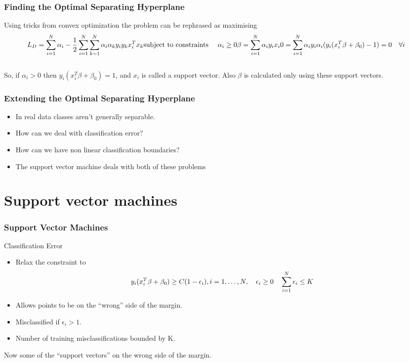 \documentclass{beamer}
\begin{document}
\begin{frame}
	\frametitle{Finding the Optimal Separating Hyperplane}
	Using tricks from convex optimization the problem can be rephrased as maximising
	\begin{equation*}
		L_D = \sum_{i=1}^N \alpha_i - \frac{1}{2}\sum_{i=1}^N\sum_{k=1}^N \alpha_i \alpha_k y_i y_k x_i^Tx_k \\
		\text{subject to constraints \quad}
		\alpha_i \ge 0\\
		\beta = \sum_{i=1}^N \alpha_i y_i x_i\\
		0 = \sum_{i=1}^N \alpha_i y_i \\
		\alpha_i(y_i(x_i^T\beta + \beta_0) -1) = 0 \quad \forall i
	\end{equation*}
	\\[14pt]
	So, if $\alpha_i>0$ then $y_i(x_i^T\beta + \beta_0) = 1$, and $x_i$ is called a support vector.
	Also $\beta$ is calculated only using these support vectors.
\end{frame}

\begin{frame}
	\frametitle{Extending the Optimal Separating Hyperplane}
	\begin{itemize}
		\item In real data classes aren't generally separable.
		\item How can we deal with classification error?
		\item How can we have non linear classification boundaries?
		\item The support vector machine deals with both of these problems
	\end{itemize}
	
\end{frame}

\section{Support vector machines}

\begin{frame}
	\frametitle{Support Vector Machines}
	Classification Error
		\begin{itemize}
			\item Relax the constraint to 
			\begin{equation*}
			y_i(x_i^T\beta + \beta_0) \ge C (1- \epsilon_i), \\
			i = 1,\ldots, N, \quad \epsilon_i\ge 0 \quad \sum_{i=1}^N \epsilon_i \le K
			\end{equation*}
			\item Allows points to be on the ``wrong'' side of the margin.
			\item Misclassified if $\epsilon_i > 1$.
			\item Number of training misclassifications bounded by K.
		\end{itemize}
		Now some of the ``support vectors'' on the wrong side of the margin.
		
	
\end{frame}
\end{document}
